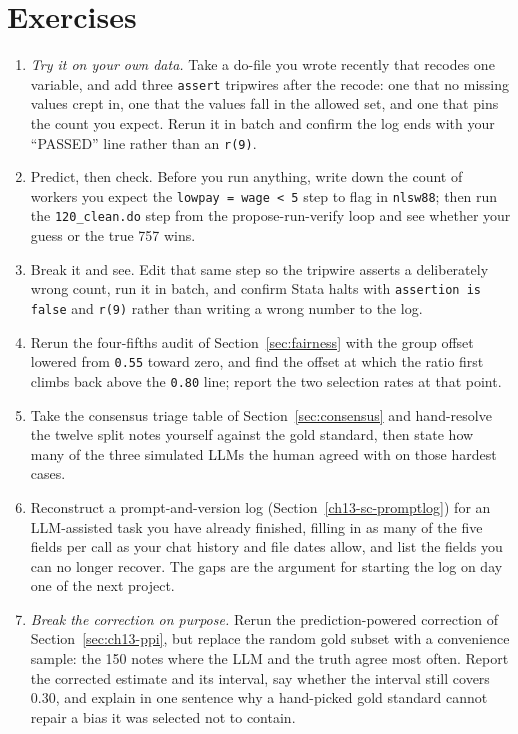 \documentclass[
    a4paper,
    fontsize=10pt,
    twoside=true,
    numbers=noenddot,
]{kaobook}
\begin{document}
\section*{Exercises}
\begin{enumerate}
    \item \emph{Try it on your own data.} Take a do-file you wrote recently that recodes one variable, and add three \texttt{assert} tripwires after the recode: one that no missing values crept in, one that the values fall in the allowed set, and one that pins the count you expect. Rerun it in batch and confirm the log ends with your \enquote{PASSED} line rather than an \texttt{r(9)}.
    \item Predict, then check. Before you run anything, write down the count of workers you expect the \texttt{lowpay = wage < 5} step to flag in \texttt{nlsw88}; then run the \texttt{120\_clean.do} step from the propose-run-verify loop and see whether your guess or the true 757 wins.
    \item Break it and see. Edit that same step so the tripwire asserts a deliberately wrong count, run it in batch, and confirm Stata halts with \texttt{assertion is false} and \texttt{r(9)} rather than writing a wrong number to the log.
    \item Rerun the four-fifths audit of Section~\ref{sec:fairness} with the group offset lowered from \texttt{0.55} toward zero, and find the offset at which the ratio first climbs back above the \texttt{0.80} line; report the two selection rates at that point.
    \item Take the consensus triage table of Section~\ref{sec:consensus} and hand-resolve the twelve split notes yourself against the gold standard, then state how many of the three simulated LLMs the human agreed with on those hardest cases.
    \item Reconstruct a prompt-and-version log (Section~\ref{ch13-sc-promptlog}) for an LLM-assisted task you have already finished, filling in as many of the five fields per call as your chat history and file dates allow, and list the fields you can no longer recover. The gaps are the argument for starting the log on day one of the next project.
    \item \emph{Break the correction on purpose.} Rerun the prediction-powered correction of Section~\ref{sec:ch13-ppi}, but replace the random gold subset with a convenience sample: the 150 notes where the LLM and the truth agree most often. Report the corrected estimate and its interval, say whether the interval still covers 0.30, and explain in one sentence why a hand-picked gold standard cannot repair a bias it was selected not to contain.
\end{enumerate}
\end{document}
